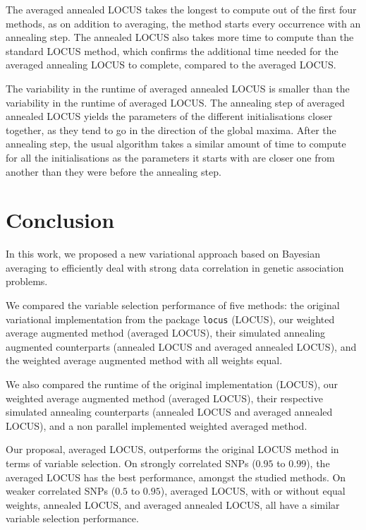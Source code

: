 \documentclass[a4paper, 11pt]{report}
\numberwithin{equation}{chapter}
\begin{document}
The averaged annealed LOCUS takes the longest to compute out of the first four methods, as on addition to averaging, the method starts every occurrence with an annealing step. The annealed LOCUS also takes more time to compute than the standard LOCUS method, which confirms the additional time needed for the averaged annealing LOCUS to complete, compared to the averaged LOCUS.

The variability in the runtime of averaged annealed LOCUS is smaller than the variability in the runtime of averaged LOCUS. The annealing step of averaged annealed LOCUS yields the parameters of the different initialisations closer together, as they tend to go in the direction of the global maxima. After the annealing step, the usual algorithm takes a similar amount of time to compute for all the initialisations as the parameters it starts with are closer one from another than they were before the annealing step.
%
%
%
%
%
%
\newpage
\chapter{Conclusion}
In this work, we proposed a new variational approach based on Bayesian averaging to efficiently deal with strong data correlation in genetic association problems.

We compared the variable selection performance of five methods: the original variational implementation from the package \texttt{locus} (LOCUS), our weighted average augmented method (averaged LOCUS), their simulated annealing augmented counterparts (annealed LOCUS and averaged annealed LOCUS), and the weighted average augmented method with all weights equal.

We also compared the runtime of the original implementation (LOCUS), our weighted average augmented method (averaged LOCUS), their respective simulated annealing counterparts (annealed LOCUS and averaged annealed LOCUS), and a non parallel implemented weighted averaged method.

Our proposal, averaged LOCUS, outperforms the original LOCUS method in terms of variable selection. On strongly correlated SNPs ($0.95$ to $0.99$), the averaged LOCUS has the best performance, amongst the studied methods. On weaker correlated SNPs ($0.5$ to $0.95$), averaged LOCUS, with or without equal weights, annealed LOCUS, and averaged annealed LOCUS, all have a similar variable selection performance.
\end{document}
